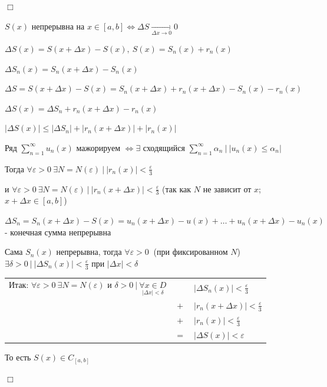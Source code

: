 \documentclass[12pt]{article}
\begin{document}
    \begin{MyProof}
        $\Box$

        $S(x)$ непрерывна на $x \in [a, b] \Longleftrightarrow \Delta S \underset{\Delta x \to 0}{\rightarrow} 0$

        $\Delta S(x) = S(x + \Delta x) - S(x), \ S(x) = S_n(x) + r_n(x)$

        $\Delta S_n(x) = S_n(x + \Delta x) - S_n(x)$

        $\Delta S = S(x + \Delta x) - S(x) = S_n(x + \Delta x) + r_n(x +  \Delta x) - S_n(x) - r_n(x)$

        $\Delta S(x) = \Delta S_n + r_n(x + \Delta x) - r_n(x)$

        $|\Delta S(x)| \leq |\Delta S_n| + |r_n(x + \Delta x)| + |r_n(x)|$

        Ряд $\sum_{n = 1}^\infty u_n(x)$ мажорируем $\Longleftrightarrow \exists$ сходящийся $\sum_{n = 1}^\infty \alpha_n \ \Big| \ |u_n(x) \leq \alpha_n|$
    
        Тогда $\forall \varepsilon > 0 \ \exists N = N(\varepsilon) \ | \ |r_n(x)| < \frac{\varepsilon}{3}$

        и $\forall \varepsilon > 0 \ \exists N = N(\varepsilon) \ | \ |r_n(x + \Delta x)| < \frac{\varepsilon}{3}$ (так как $N$ не зависит от $x$; $x + \Delta x \in [a, b]$) 
    
        $\Delta S_n = S_n(x + \Delta x) - S(x) = u_n(x + \Delta x) - u(x) + \dots + u_n(x + \Delta x) - u_n(x)$ - конечная сумма непрерывна

        Сама $S_n(x)$ непрерывна, тогда $\forall \varepsilon > 0 \ $ (при фиксированном $N$) $\exists \delta > 0 \ | \ |\Delta S_n(x)| < \frac{\varepsilon}{3}$ при $|\Delta x| < \delta$

        \bgroup
        \setlength\tabcolsep{1.5pt}
        \begin{tabular}{ccl}
            Итак: $\forall \varepsilon > 0 \ \exists N = N(\varepsilon)$ и $\delta > 0 \ | \ \underset{|\Delta x| < \delta}{\forall x \in D}$ & & $|\Delta S_n(x)| < \frac{\varepsilon}{3}$ \\
            
            & $+$ & $|r_n(x + \Delta x)| < \frac{\varepsilon}{3}$ \\ 
            
            & $+$ & $|r_n(x)| < \frac{\varepsilon}{3}$ \\

            & $=$ & $|\Delta S(x)| < \varepsilon$
        \end{tabular}
        \egroup

        То есть $S(x) \in C_{[a, b]}$

        $\Box$
    \end{MyProof}
\end{document}

